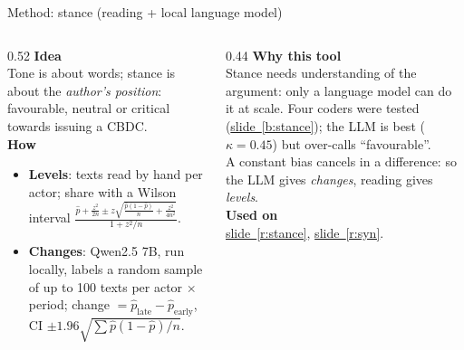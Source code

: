 \documentclass[aspectratio=169,10pt]{beamer}
\newcommand{\usedon}[1]{\hyperref[#1]{\textcolor{c4}{slide~\ref*{#1}}}}
\newcommand{\mhead}[1]{\textcolor{c1}{\textbf{#1}}\\[1pt]}
\begin{document}
\begin{frame}{Method: stance (reading + local language model)}
\begin{columns}[T]
\begin{column}{0.52\textwidth}\footnotesize
\mhead{Idea}
Tone is about words; stance is about the \emph{author's position}: favourable, neutral or critical towards issuing a CBDC.\\[4pt]
\mhead{How}
\begin{itemize}\setlength\itemsep{1pt}
\item \textbf{Levels}: texts read by hand per actor; share with a \alert{Wilson} interval $\frac{\hat p + \frac{z^2}{2n} \pm z\sqrt{\frac{\hat p(1-\hat p)}{n}+\frac{z^2}{4n^2}}}{1+z^2/n}$.
\item \textbf{Changes}: Qwen2.5 7B, run locally, labels a random sample of up to 100 texts per actor $\times$ period; change $= \hat p_{\text{late}} - \hat p_{\text{early}}$, CI $\pm 1.96\sqrt{\sum \hat p(1-\hat p)/n}$.
\end{itemize}
\end{column}
\begin{column}{0.44\textwidth}\footnotesize
\mhead{Why this tool}
Stance needs understanding of the argument: only a language model can do it at scale. Four coders were tested (\usedon{b:stance}); the LLM is best ($\kappa = 0.45$) but over-calls ``favourable''.\\[3pt]
A constant bias cancels in a difference: so the LLM gives \emph{changes}, reading gives \emph{levels}.\\[6pt]
\mhead{Used on}
\usedon{r:stance}, \usedon{r:syn}.
\end{column}
\end{columns}
\end{frame}
\end{document}
